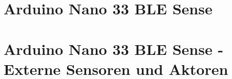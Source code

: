 \documentclass[10pt,a4paper,bibliography=totoc]{scrbook}
\begin{document}
{


\part{Arduino Nano 33 BLE Sense}
\label{part:Teil1}
      
   
  














{
\part{Arduino Nano 33 BLE Sense - Externe Sensoren und Aktoren}
\label{part:Teil2}
   
   
   




}}
\end{document}
